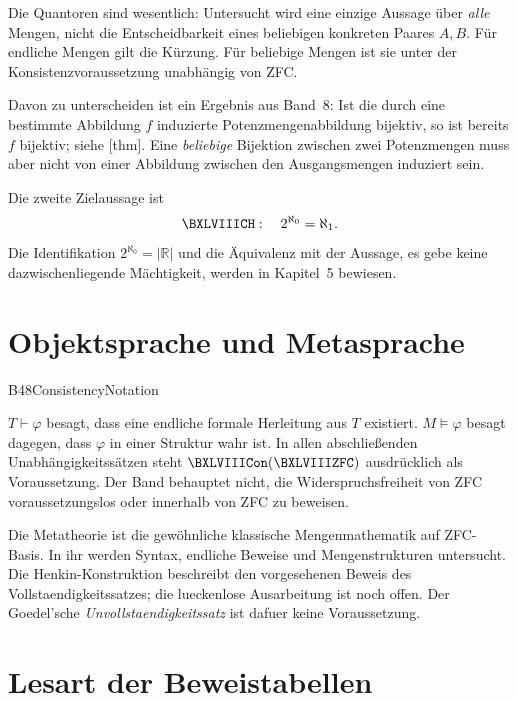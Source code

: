 \noindent
Die Quantoren sind wesentlich: Untersucht wird eine einzige Aussage über
\emph{alle} Mengen, nicht die Entscheidbarkeit eines beliebigen konkreten
Paares \(A,B\). Für endliche Mengen gilt die Kürzung. Für beliebige Mengen
ist sie unter der Konsistenzvoraussetzung unabhängig von ZFC.

Davon zu unterscheiden ist ein Ergebnis aus Band~8:
Ist die durch eine bestimmte Abbildung \(f\) induzierte Potenzmengenabbildung
bijektiv, so ist bereits \(f\) bijektiv; siehe
[thm].
Eine \emph{beliebige} Bijektion zwischen zwei Potenzmengen muss aber nicht
von einer Abbildung zwischen den Ausgangsmengen induziert sein.

Die zweite Zielaussage ist
\[
 \BXLVIIICH:\quad 2^{\aleph_0}=\aleph_1.
\]
Die Identifikation \(2^{\aleph_0}=|\mathbb R|\) und die Äquivalenz mit der
Aussage, es gebe keine dazwischenliegende Mächtigkeit, werden in
Kapitel~5 bewiesen.

\section{Objektsprache und Metasprache}

{B48ConsistencyNotation}{
}

\noindent
\(T\vdash\varphi\) besagt, dass eine endliche formale Herleitung aus \(T\)
existiert. \(M\models\varphi\) besagt dagegen, dass \(\varphi\) in einer
Struktur wahr ist. In allen abschließenden Unabhängigkeitssätzen steht
\(\BXLVIIICon(\BXLVIIIZFC)\) ausdrücklich als Voraussetzung. Der Band
behauptet nicht, die Widerspruchsfreiheit von ZFC voraussetzungslos oder
innerhalb von ZFC zu beweisen.

Die Metatheorie ist die gewöhnliche klassische Mengenmathematik auf
ZFC-Basis. In ihr werden Syntax, endliche Beweise und Mengenstrukturen
untersucht. Die Henkin-Konstruktion beschreibt den vorgesehenen Beweis
des Vollstaendigkeitssatzes; die lueckenlose Ausarbeitung ist noch offen.
Der Goedel'sche \emph{Unvollstaendigkeitssatz} ist dafuer keine
Voraussetzung.

\section{Lesart der Beweistabellen}

